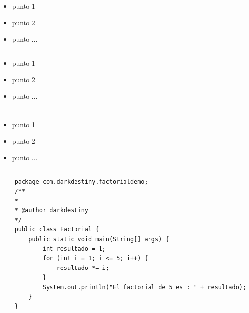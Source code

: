 \documentclass[10pt,a4paper]{article}
\begin{document}
\pagebreak

\section{\color{colorIPN}{Conceptos}}
\lipsum[2-3]

\subsection{ \color{colorESCOM}{Concepto 1}}

\begin{itemize}
	\item  punto 1
	\item  punto 2	
	\item  punto ...
	
\end{itemize}

\subsection{\color{colorESCOM}{Concepto 2}}
\begin{itemize}
	\item  punto 1
	\item  punto 2	
	\item  punto ...
	
\end{itemize}

\pagebreak

\section{\color{colorIPN}{Desarrollo}}
\lipsum[2-3]
\begin{itemize}
	\item  punto 1
	\item  punto 2	
	\item  punto ...
	
\end{itemize}

\subsection{
	\textit{
		\color{colorESCOM}{Factorial.java }
	}
}
\lipsum[2-3]
\hfill \break

\begin{lstlisting}
	package com.darkdestiny.factorialdemo;
	/**
	*
	* @author darkdestiny
	*/
	public class Factorial {
		public static void main(String[] args) {
			int resultado = 1;
			for (int i = 1; i <= 5; i++) {
				resultado *= i;
			}
			System.out.println("El factorial de 5 es : " + resultado);
		}
	}
\end{lstlisting} \hfill
\end{document}
